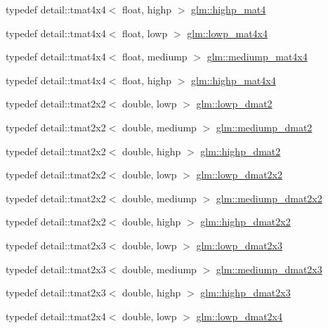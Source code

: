 \begin{CompactItemize}
\item 
typedef detail::tmat4x4$<$ float, highp $>$ \hyperlink{group__core__precision_g3067b3b8ce793227a51b2e3c233257d5}{glm::highp\_\-mat4}
\item 
typedef detail::tmat4x4$<$ float, lowp $>$ \hyperlink{group__core__precision_gd31846a0565c22a0479950313c28b218}{glm::lowp\_\-mat4x4}
\item 
typedef detail::tmat4x4$<$ float, mediump $>$ \hyperlink{group__core__precision_gcb51d2d10f7607617ac544f6db9a6eef}{glm::mediump\_\-mat4x4}
\item 
typedef detail::tmat4x4$<$ float, highp $>$ \hyperlink{group__core__precision_g231950d260be295a25d7340e2020f55c}{glm::highp\_\-mat4x4}
\item 
typedef detail::tmat2x2$<$ double, lowp $>$ \hyperlink{group__core__precision_g5e08c45dfef867e0326a1eee95060cd0}{glm::lowp\_\-dmat2}
\item 
typedef detail::tmat2x2$<$ double, mediump $>$ \hyperlink{group__core__precision_gc056ec9d1c37e591172544088163b7e4}{glm::mediump\_\-dmat2}
\item 
typedef detail::tmat2x2$<$ double, highp $>$ \hyperlink{group__core__precision_g9b158b3b722fe991bb66f7e65f136e68}{glm::highp\_\-dmat2}
\item 
typedef detail::tmat2x2$<$ double, lowp $>$ \hyperlink{group__core__precision_g68b486ff22814c1a3781378513a9fcc0}{glm::lowp\_\-dmat2x2}
\item 
typedef detail::tmat2x2$<$ double, mediump $>$ \hyperlink{group__core__precision_g88ddb4188060ab00fee67c9840f4417e}{glm::mediump\_\-dmat2x2}
\item 
typedef detail::tmat2x2$<$ double, highp $>$ \hyperlink{group__core__precision_ga5e35f6570d394c1cd34f411a473220c}{glm::highp\_\-dmat2x2}
\item 
typedef detail::tmat2x3$<$ double, lowp $>$ \hyperlink{group__core__precision_g2c7432984a35cf72050870a54485ef35}{glm::lowp\_\-dmat2x3}
\item 
typedef detail::tmat2x3$<$ double, mediump $>$ \hyperlink{group__core__precision_g734e988edf759c7012c443014acb6674}{glm::mediump\_\-dmat2x3}
\item 
typedef detail::tmat2x3$<$ double, highp $>$ \hyperlink{group__core__precision_gfec7367665f006f2a7643103c5eddc38}{glm::highp\_\-dmat2x3}
\item 
typedef detail::tmat2x4$<$ double, lowp $>$ \hyperlink{group__core__precision_gc2285cef559b0dc35cb9a7f22e6a2dd8}{glm::lowp\_\-dmat2x4}
\item 

\end{CompactItemize}

